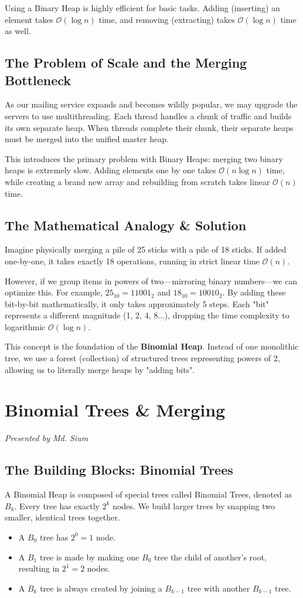 \documentclass[11pt, a4paper]{report}
\begin{document}
Using a Binary Heap is highly efficient for basic tasks. Adding (inserting) an element takes $\mathcal{O}(\log n)$ time, and removing (extracting) takes $\mathcal{O}(\log n)$ time as well.

\section{The Problem of Scale and the Merging Bottleneck}
As our mailing service expands and becomes wildly popular, we may upgrade the servers to use multithreading. Each thread handles a chunk of traffic and builds its own separate heap. When threads complete their chunk, their separate heaps must be merged into the unified master heap. 

This introduces the primary problem with Binary Heaps: merging two binary heaps is extremely slow. Adding elements one by one takes $\mathcal{O}(n \log n)$ time, while creating a brand new array and rebuilding from scratch takes linear $\mathcal{O}(n)$ time.

\section{The Mathematical Analogy \& Solution}
Imagine physically merging a pile of 25 sticks with a pile of 18 sticks. If added one-by-one, it takes exactly 18 operations, running in strict linear time $\mathcal{O}(n)$. 

However, if we group items in powers of two—mirroring binary numbers—we can optimize this. For example, $25_{10} = 11001_2$ and $18_{10} = 10010_2$. By adding these bit-by-bit mathematically, it only takes approximately 5 steps. Each "bit" represents a different magnitude (1, 2, 4, 8...), dropping the time complexity to logarithmic $\mathcal{O}(\log n)$. 

This concept is the foundation of the \textbf{Binomial Heap}. Instead of one monolithic tree, we use a forest (collection) of structured trees representing powers of 2, allowing us to literally merge heaps by "adding bits".

\chapter{Binomial Trees \& Merging}
\textit{Presented by Md. Sium}

\section{The Building Blocks: Binomial Trees}
A Binomial Heap is composed of special trees called Binomial Trees, denoted as $B_k$. Every tree has exactly $2^k$ nodes. We build larger trees by snapping two smaller, identical trees together.
\begin{itemize}
    \item A $B_0$ tree has $2^0 = 1$ node.
    \item A $B_1$ tree is made by making one $B_0$ tree the child of another's root, resulting in $2^1 = 2$ nodes.
    \item A $B_k$ tree is always created by joining a $B_{k-1}$ tree with another $B_{k-1}$ tree.
\end{itemize}
\end{document}

